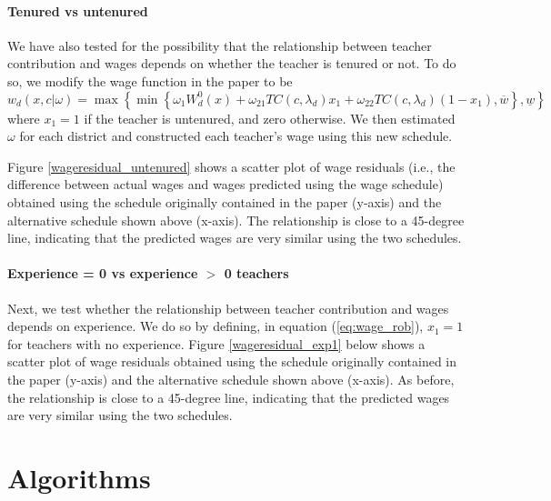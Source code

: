 \documentclass[notitlepage,12pt]{article}%
\begin{document}
\paragraph{Tenured vs untenured}

We have also tested for the possibility that the relationship between teacher
contribution and wages depends on whether the teacher is tenured or not. To do
so, we modify the wage function in the paper to be
\begin{equation}
\label{eq:wage_rob}w_{d}\left(  x,c|\omega\right)  =\max\left\{  \min\left\{
\omega_{1}W_{d}^{0}\left(  x\right)  +\omega_{21}TC\left(  c,\lambda
_{d}\right)  x_{1}+\omega_{22}TC\left(  c,\lambda_{d}\right)  (1-x_{1}%
),\overline{w}\right\}  ,\underline{w}\right\}
\end{equation}
where $x_{1}=1$ if the teacher is untenured, and zero otherwise. We then
estimated $\omega$ for each district and constructed each teacher's wage using
this new schedule.

Figure \ref{wageresidual_untenured} shows a scatter plot of wage residuals
(i.e., the difference between actual wages and wages predicted using the wage
schedule) obtained using the schedule originally contained in the paper
(y-axis) and the alternative schedule shown above (x-axis). The relationship
is close to a 45-degree line, indicating that the predicted wages are very
similar using the two schedules.

\paragraph{Experience = 0 vs experience $>$ 0 teachers}

Next, we test whether the relationship between teacher contribution and wages
depends on experience. We do so by defining, in equation (\ref{eq:wage_rob}),
$x_{1}=1$ for teachers with no experience. Figure \ref{wageresidual_exp1}
below shows a scatter plot of wage residuals obtained using the schedule
originally contained in the paper (y-axis) and the alternative schedule shown
above (x-axis). As before, the relationship is close to a 45-degree line,
indicating that the predicted wages are very similar using the two schedules.



\section{Algorithms}
\end{document}
